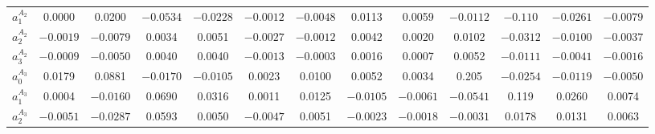 \documentclass[aps,superscriptaddress,showpacs,nofootinbib,11pt]{revtex4-1}
\begin{document}
\begin{table}[h]
\begin{ruledtabular}
\begin{center}
{\begin{tabular}{ccccccccccccc}
$a_1^{{A_2}}$&  \hspace{.25cm}0.0000 &  \hspace{.25cm}0.0200 & $-0.0534$&  $-0.0228$ & $-0.0012$ & $-0.0048$ &  \hspace{.25cm}0.0113  & \hspace{.25cm}0.0059 & $-0.0112$ & $-0.110$& $ -0.0261$&  $-0.0079$\\
$a_2^{{A_2}}$& $-0.0019$ & $-0.0079$  & \hspace{.25cm}0.0034  & \hspace{.25cm}0.0051 & $-0.0027$&  $-0.0012$ &  \hspace{.25cm}0.0042 &  \hspace{.25cm}0.0020 &  \hspace{.25cm}0.0102&  $-0.0312$&  $-0.0100$&  $-0.0037$\\
$a_3^{{A_2}}$& $-0.0009$ & $-0.0050$&   \hspace{.25cm}0.0040&   \hspace{.25cm}0.0040 & $-0.0013$&  $-0.0003$&   \hspace{.25cm}0.0016 &  \hspace{.25cm}0.0007 &  \hspace{.25cm}0.0052&  $-0.0111$&  $-0.0041$&  $-0.0016$\\
$a_0^{{A_3}}$&   \hspace{.25cm}0.0179 &  \hspace{.25cm}0.0881&  $-0.0170$&  $-0.0105$ &  \hspace{.25cm}0.0023&   \hspace{.25cm}0.0100&   \hspace{.25cm}0.0052 &  \hspace{.25cm}0.0034 &  \hspace{.05cm}0.205&  $-0.0254$&  $-0.0119$&  $-0.0050$\\
$a_1^{{A_3}}$&  \hspace{.25cm}0.0004 & $-0.0160$&   \hspace{.25cm}0.0690&   \hspace{.25cm}0.0316 &  \hspace{.25cm}0.0011&   \hspace{.25cm}0.0125&  $-0.0105$ & $-0.0061$ & $-0.0541$&   \hspace{.05cm}0.119&   \hspace{.25cm}0.0260&	\hspace{.25cm}0.0074\\
$a_2^{{A_3}}$& $-0.0051$&  $-0.0287$&   \hspace{.25cm}0.0593&   \hspace{.25cm}0.0050 & $-0.0047$&   \hspace{.25cm}0.0051&  $-0.0023$ & $-0.0018$ & $-0.0031$&   \hspace{.25cm}0.0178&   \hspace{.25cm}0.0131&	\hspace{.25cm}0.0063\\

\end{tabular}}
\end{center}
\end{ruledtabular}
\end{table}
\end{document}
